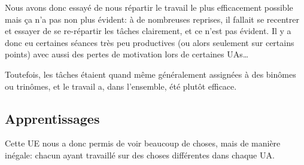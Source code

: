Nous avons donc essayé de nous répartir le travail le plus efficacement possible
mais ça n'a pas non plus évident: à de nombreuses reprises, il fallait se recentrer
et essayer de se re-répartir les tâches clairement, et ce n'est pas évident.
Il y a donc eu certaines séances très peu productives (ou alors seulement
sur certains points) avec aussi des pertes de motivation lors de certaines UAs\dots

Toutefois, les tâches étaient quand même généralement assignées à des binômes
ou trinômes, et le travail a, dans l'ensemble, été plutôt efficace.

\subsection{Apprentissages}
Cette UE nous a donc permis de voir beaucoup de choses, mais de manière
inégale: chacun ayant travaillé sur des choses différentes dans chaque UA.
